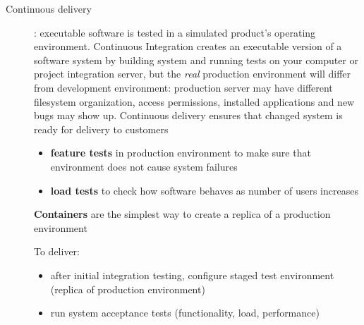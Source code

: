 \begin{description}
   \item[Continuous delivery]: executable software is tested in a simulated product’s operating environment.\nl
         Continuous Integration creates an executable version of a software system by building system and running tests on your computer or project integration server, but the \textit{real} production environment will differ from development
         environment: production server may have different filesystem organization, access permissions, installed applications and new bugs may show up. \nl
         Continuous delivery ensures that changed system is ready for delivery to customers
         \begin{itemize}
            \item \textbf{feature tests} in production environment to make sure that environment does not cause system failures
            \item \textbf{load tests} to check how software behaves as number of users increases
         \end{itemize}
         \textbf{Containers} are the simplest way to create a replica of a production environment

         To deliver:
         \begin{itemize}[topsep=-\parskip,noitemsep]
            \item after initial integration testing, configure staged test environment (replica of production environment)
            \item run system acceptance tests (functionality, load, performance)
         \end{itemize}



\end{description}
